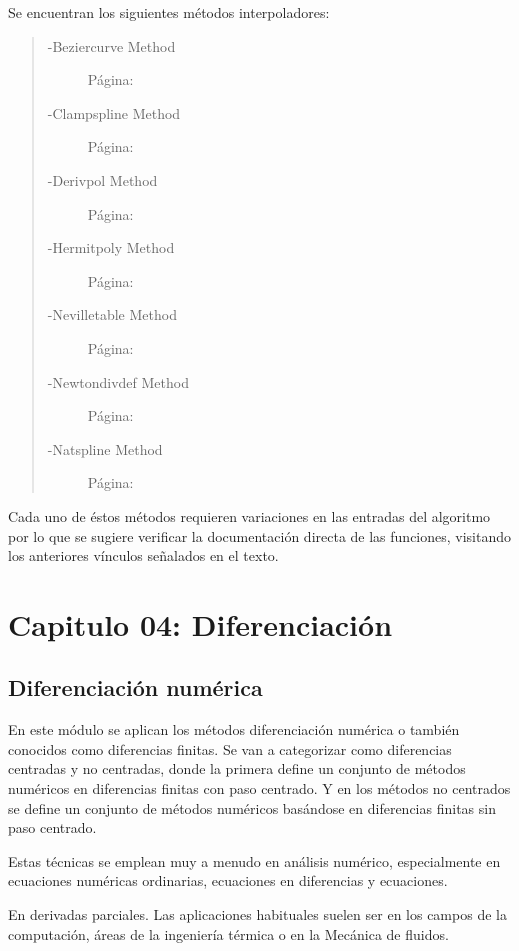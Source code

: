 \documentclass[letterpaper,10pt,oneside]{sphinxmanual}
\theoremstyle{plain}%
\theoremstyle{definition}%
\theoremstyle{remark}%
\begin{document}
Se encuentran los siguientes métodos interpoladores:
\begin{quote}
\begin{description}
\item[{-Beziercurve Method}]Página: \pageref{code:module-beziercurve}
\item[{-Clampspline Method}]Página: \pageref{code:module-clampspline}
\item[{-Derivpol Method}]Página: \pageref{code:module-derivpol}
\item[{-Hermitpoly Method}]Página: \pageref{code:module-hermitpoly}
\item[{-Nevilletable Method}]Página: \pageref{code:module-nevilletable}
\item[{-Newtondivdef Method}]Página: \pageref{code:module-newtondivdef}
\item[{-Natspline Method}]Página: \pageref{code:module-natspline}
\end{description}
\end{quote}

Cada uno de éstos métodos requieren variaciones en las entradas del algoritmo por lo que se sugiere verificar la documentación directa de las funciones, visitando los anteriores vínculos señalados en el texto.


\chapter{Capitulo 04: Diferenciación}
\label{chapter04::doc}\label{chapter04:capitulo-04-Diferenciación}

\section{Diferenciación numérica}
\label{chapter04:Diferenciación numérica}

En este módulo se aplican los métodos diferenciación numérica o también conocidos como diferencias finitas. Se van a categorizar como diferencias centradas y no centradas, donde la primera define un conjunto de métodos numéricos en diferencias finitas con paso centrado. Y en los métodos no centrados se define un conjunto de métodos numéricos basándose en diferencias finitas sin paso centrado.

Estas técnicas se emplean muy a menudo en análisis numérico, especialmente en ecuaciones numéricas ordinarias, ecuaciones en diferencias y ecuaciones.

En derivadas parciales. Las aplicaciones habituales suelen ser en los campos de la computación, áreas de la ingeniería térmica o en la Mecánica de fluidos.
\end{document}
